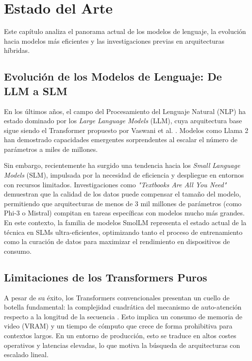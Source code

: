 \section{Estado del Arte}
\label{sec:estado_del_arte}

Este capítulo analiza el panorama actual de los modelos de lenguaje, la evolución hacia modelos más eficientes y las investigaciones previas en arquitecturas híbridas.

\subsection{Evolución de los Modelos de Lenguaje: De LLM a SLM}
    En los últimos años, el campo del Procesamiento del Lenguaje Natural (NLP) ha estado dominado por los \textit{Large Language Models} (LLM), cuya arquitectura base sigue siendo el Transformer propuesto por Vaswani et al. \cite{vaswani2017attention}. Modelos como Llama 2 \cite{touvron2023llama} han demostrado capacidades emergentes sorprendentes al escalar el número de parámetros a miles de millones. 

Sin embargo, recientemente ha surgido una tendencia hacia los \textit{Small Language Models} (SLM), impulsada por la necesidad de eficiencia y despliegue en entornos con recursos limitados. Investigaciones como \textit{"Textbooks Are All You Need"} \cite{gunasekar2023textbooks} demuestran que la calidad de los datos puede compensar el tamaño del modelo, permitiendo que arquitecturas de menos de 3 mil millones de parámetros (como Phi-3 o Mistral) compitan en tareas específicas con modelos mucho más grandes. En este contexto, la familia de modelos SmolLM \cite{allal2024smollm} representa el estado actual de la técnica en SLMs ultra-eficientes, optimizando tanto el proceso de entrenamiento como la curación de datos para maximizar el rendimiento en dispositivos de consumo.

\subsection{Limitaciones de los Transformers Puros}
A pesar de su éxito, los Transformers convencionales presentan un cuello de botella fundamental: la complejidad cuadrática del mecanismo de auto-atención respecto a la longitud de la secuencia \cite{vaswani2017attention}. Esto implica un consumo de memoria de video (VRAM) y un tiempo de cómputo que crece de forma prohibitiva para contextos largos. En un entorno de producción, esto se traduce en altos costes operativos y latencias elevadas, lo que motiva la búsqueda de arquitecturas con escalado lineal.

